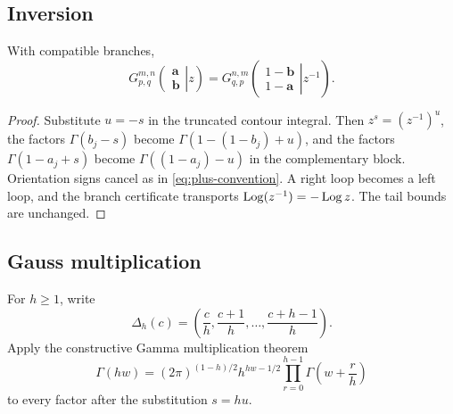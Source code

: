 \subsection{Inversion}

\begin{theorem}[Inversion]\label{thm:inversion}
With compatible branches,
\begin{equation}\label{eq:inversion}
G_{p,q}^{m,n}\!\left(
 \left.\begin{matrix}\mathbf a\\\mathbf b\end{matrix}\right|z\right)
=G_{q,p}^{n,m}\!\left(
 \left.\begin{matrix}1-\mathbf b\\1-\mathbf a\end{matrix}\right|z^{-1}\right).
\end{equation}
\end{theorem}
\begin{proof}
Substitute $u=-s$ in the truncated contour integral.  Then
$z^s=(z^{-1})^u$, the factors $\Gamma(b_j-s)$ become
$\Gamma(1-(1-b_j)+u)$, and the factors $\Gamma(1-a_j+s)$ become
$\Gamma((1-a_j)-u)$ in the complementary block.  Orientation signs cancel as
in \eqref{eq:plus-convention}.  A right loop becomes a left loop, and the
branch certificate transports $\operatorname{Log}(z^{-1})=-\operatorname{Log} z$.  The tail bounds are
unchanged.
\end{proof}

\subsection{Gauss multiplication}

For $h\ge1$, write
\[
 \Delta_h(c)=\left(\frac c h,\frac{c+1}h,\ldots,\frac{c+h-1}h\right).
\]
Apply the constructive Gamma multiplication theorem
\begin{equation}\label{eq:gauss-mult}
 \Gamma(hw)=(2\pi)^{(1-h)/2}h^{hw-1/2}
 \prod_{r=0}^{h-1}\Gamma\!\left(w+\frac rh\right)
\end{equation}
to every factor after the substitution $s=hu$.

